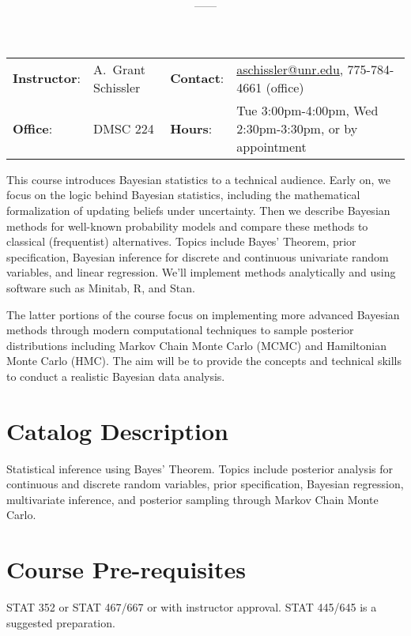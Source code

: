 \documentclass[11pt,onecolumn]{article}
\title{\textbf{\coursename}}
\author{{\semester}---{\roomnumb}---{\classtimes}}
\date{}
\makeatletter
\newcommand{\myname}{A.~Grant Schissler}
\newcommand{\myemail}{aschissler@unr.edu}
\newcommand{\office}{DMSC 224}
\newcommand{\officehours}{Tue 3:00pm-4:00pm, Wed 2:30pm-3:30pm, or by appointment}
\makeatother
\begin{document}
\maketitle

\vspace{-0.25in}
\noindent\makebox[\linewidth]{\rule{\textwidth}{1pt}}

\begin{center}
\begin{tabular}{llll}
\textbf{Instructor}:&\myname & \textbf{Contact}:&\href{mailto:\myemail}{\myemail}, 775-784-4661 (office)\\
\textbf{Office}:&\office & \textbf{Hours}:&\officehours\\
\end{tabular}
\end{center}

This course introduces Bayesian statistics to a technical audience. Early on, we focus on the logic behind Bayesian statistics, including the mathematical formalization of updating beliefs under uncertainty. Then we describe Bayesian methods for well-known probability models and compare these methods to classical (frequentist) alternatives. Topics include Bayes' Theorem, prior specification, Bayesian inference for discrete and continuous univariate random variables, and linear regression. We'll implement methods analytically and using software such as Minitab, R, and Stan.

The latter portions of the course focus on implementing more advanced Bayesian methods through modern computational techniques to sample posterior distributions including Markov Chain Monte Carlo (MCMC) and Hamiltonian Monte Carlo (HMC). The aim will be to provide the concepts and technical skills to conduct a realistic Bayesian data analysis. 

\section*{Catalog Description}
Statistical inference using Bayes' Theorem. Topics include posterior analysis for continuous and discrete random variables, prior specification, Bayesian regression, multivariate inference, and posterior sampling through Markov Chain Monte Carlo.

\section*{Course Pre-requisites}
STAT 352 or STAT 467/667 or with instructor approval. STAT 445/645 is a suggested preparation.
\end{document}
